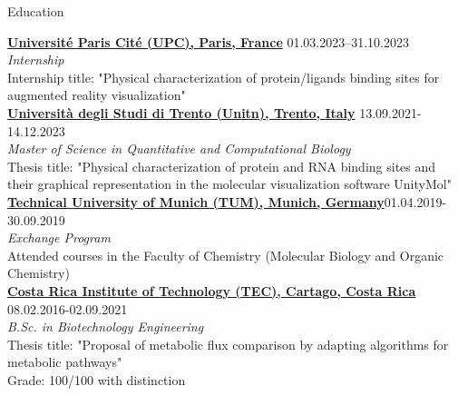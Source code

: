 \address{Address : Italy, Trento, Via della Malpensada 140}
\address{Mobile (Costa Rica) : (+506) 8714 4835, Mobile (Italy) : (+39) 371 5704162}
\address{Email : \href{mailto:diego.barqueromorera@studenti.unitn.it}{diego.barqueromorera@studenti.unitn.it} $\qquad$ \href{https://github.com/DiegoBarMor}{GitHub} $\qquad$ \href{https://www.linkedin.com/in/diego-barquero-morera-98863020b/}{LinkedIn}}




\begin{rSection}{Education}

	\vspace{\baselineskip}

	{\bf \href{https://u-paris.fr/en/}{Université Paris Cité (UPC), Paris, France}} \hfill {01.03.2023–31.10.2023} \\
	\textit{Internship}\\
	Internship title: "Physical characterization of protein/ligands binding sites for augmented reality visualization"\\

	{\bf \href{https://www.unitn.it/}{Università degli Studi di Trento (Unitn), Trento, Italy}} \hfill {13.09.2021-14.12.2023} \\
	\textit{Master of Science in Quantitative and Computational Biology}\\
	Thesis title: "Physical characterization of protein and RNA binding sites and their graphical representation in the molecular visualization software UnityMol"\\

	{\bf \href{https://www.tum.de/en/}{Technical University of Munich (TUM), Munich, Germany}}\hfill {01.04.2019-30.09.2019}\\
	\textit{Exchange Program}\\
	Attended courses in the Faculty of Chemistry (Molecular Biology and Organic Chemistry)\\

	{\bf \href{https://www.tec.ac.cr/}{Costa Rica Institute of Technology (TEC), Cartago, Costa Rica}} \hfill {08.02.2016-02.09.2021} \\
	\textit{B.Sc. in Biotechnology Engineering}\\
	Thesis title: "Proposal of metabolic flux comparison by adapting algorithms for metabolic pathways"\\
	Grade: 100/100 with distinction


\end{rSection}

